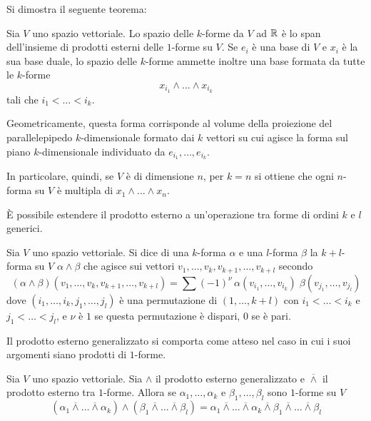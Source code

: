 Si dimostra il seguente teorema: \begin{theorem} \label{thm:kformBase}
  Sia $V$ uno spazio vettoriale. Lo spazio delle $k$-forme da $V$ ad $\mathbb{R}$ è lo span dell'insieme di prodotti esterni delle $1$-forme su $V$. Se $e_i$ è una base di $V$ e $x_i$ è la sua base duale, lo spazio delle $k$-forme ammette inoltre una base formata da tutte le $k$-forme \begin{equation*}
  x_{i_1} \wedge \ldots \wedge x_{i_k}
  \end{equation*}
  tali che $i_1 < \ldots < i_k$.
\end{theorem}
\begin{remark}
  Geometricamente, questa forma corrisponde al volume della proiezione del parallelepipedo $k$-dimensionale formato dai $k$ vettori su cui agisce la forma sul piano $k$-dimensionale individuato da $e_{i_1},\ldots,e_{i_k}$.
\end{remark}
\begin{remark} \label{rem:volumeForm}
  In particolare, quindi, se $V$ è di dimensione $n$, per $k=n$ si ottiene che ogni $n$-forma su $V$ è multipla di $x_1 \wedge \ldots \wedge x_n$.
\end{remark}

È possibile estendere il prodotto esterno a un'operazione tra forme di ordini $k$ e $l$ generici.
\begin{definition}
  Sia $V$ uno spazio vettoriale. Si dice  di una $k$-forma $\alpha$ e una $l$-forma $\beta$ la $k+l$-forma su $V$ $\alpha \wedge \beta$ che agisce sui vettori $v_1, \ldots, v_k, v_{k+1}, \ldots, v_{k+l}$ secondo
\begin{equation*}
(\alpha \wedge \beta) (v_1, \ldots, v_k, v_{k+1}, \ldots, v_{k+l}) = \sum (-1)^{\nu}\, \alpha(v_{i_1}, \ldots, v_{i_k})\; \beta(v_{j_1}, \ldots, v_{j_l})
\end{equation*} 
dove $(i_1, \ldots, i_k, j_1, \ldots, j_l)$ è una permutazione di $(1, \ldots, k+l)$ con $i_1 < \ldots < i_k$ e $j_1 < \ldots < j_l$, e $\nu$ è $1$ se questa permutazione è dispari, $0$ se è pari.
\end{definition}

Il prodotto esterno generalizzato si comporta come atteso nel caso in cui i suoi argomenti siano prodotti di $1$-forme.
\begin{theorem}
  Sia $V$ uno spazio vettoriale. Sia $\wedge$ il prodotto esterno generalizzato e $\overline{\wedge}$ il prodotto esterno tra $1$-forme. Allora se $\alpha_1, \ldots, \alpha_k$ e $\beta_1, \ldots, \beta_l$ sono $1$-forme su $V$ \begin{equation*}
  (\alpha_1 \overline{\wedge} \ldots \overline{\wedge} \alpha_k) \wedge (\beta_1 \overline{\wedge} \ldots \overline{\wedge} \beta_l) = \alpha_1 \overline{\wedge} \ldots \overline{\wedge} \alpha_k \overline{\wedge} \beta_1 \overline{\wedge} \ldots \overline{\wedge} \beta_l
  \end{equation*} 
\end{theorem}

